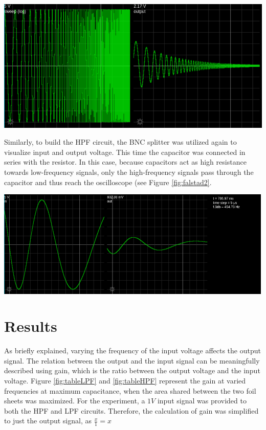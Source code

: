 \documentclass[journal]{IEEEtran}
\begin{document}
\begingroup
    \medskip
    \centering
    \includegraphics[width=\columnwidth]{images/lab4_8.png}
    \label{fig:falstad1}
    \medskip
\endgroup

\noindent Similarly, to build the HPF circuit, the BNC splitter was utilized again to visualize input and output voltage. This time the capacitor was connected in series with the resistor. In this case, because capacitors act as high resistance towards low-frequency signals, only the high-frequency signals pass through the capacitor and thus reach the oscilloscope (see Figure \ref{fig:falstad2}.

\begingroup
    \medskip
    \centering
    \includegraphics[width=\columnwidth]{images/lab4_9.png}
    \label{fig:falstad2}
    \medskip
\endgroup


\smallskip
\section{Results}

\noindent As briefly explained, varying the frequency of the input voltage affects the output signal. The relation between the output and the input signal can be meaningfully described using gain, which is the ratio between the output voltage and the input voltage. Figure \ref{fig:tableLPF} and \ref{fig:tableHPF} represent the gain at varied frequencies at maximum capacitance, when the area shared between the two foil sheets was maximized. For the experiment, a $1V$ input signal was provided to both the HPF and LPF circuits. Therefore, the calculation of gain was simplified to just the output signal, as $\frac{x}{1} = x$ \\
\end{document}

